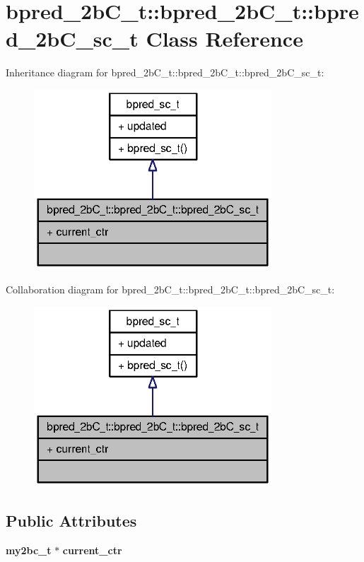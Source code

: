 \section{bpred\_\-2bC\_\-t::bpred\_\-2bC\_\-t::bpred\_\-2bC\_\-sc\_\-t Class Reference}
\label{classbpred__2bC__t_1_1bpred__2bC__sc__t}
Inheritance diagram for bpred\_\-2bC\_\-t::bpred\_\-2bC\_\-t::bpred\_\-2bC\_\-sc\_\-t:\nopagebreak
\begin{figure}[H]
\begin{center}
\leavevmode
\includegraphics[width=252pt]{classbpred__2bC__t_1_1bpred__2bC__sc__t__inherit__graph}
\end{center}
\end{figure}
Collaboration diagram for bpred\_\-2bC\_\-t::bpred\_\-2bC\_\-t::bpred\_\-2bC\_\-sc\_\-t:\nopagebreak
\begin{figure}[H]
\begin{center}
\leavevmode
\includegraphics[width=252pt]{classbpred__2bC__t_1_1bpred__2bC__sc__t__coll__graph}
\end{center}
\end{figure}
\subsection*{Public Attributes}
\begin{CompactItemize}
\item 
{\bf my2bc\_\-t} $\ast$ {\bf current\_\-ctr}
\end{CompactItemize}


